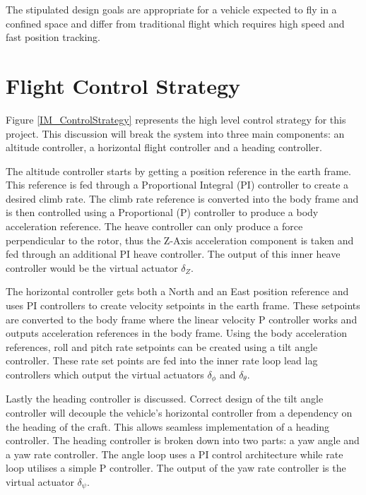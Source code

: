 The stipulated design goals are appropriate for a vehicle expected to fly in a confined space and differ from traditional flight which requires high speed and fast position tracking.

\section{Flight Control Strategy}
Figure \ref{IM_ControlStrategy} represents the high level control strategy for this project. This discussion will break the system into three main components: an altitude controller, a horizontal flight controller and a heading controller.	

The altitude controller starts by getting a position reference in the earth frame. This reference is fed through a Proportional Integral (PI) controller to create a desired climb rate. The climb rate reference is converted into the body frame and is then controlled using a Proportional (P) controller to produce a body acceleration reference. The heave controller can only produce a force perpendicular to the rotor, thus the Z-Axis acceleration component is taken and fed through an additional PI heave controller. The output of this inner heave controller would be the virtual actuator $\delta_Z$.

The horizontal controller gets both a North and an East position reference and uses PI controllers to create velocity setpoints in the earth frame. These setpoints are converted to the body frame where the linear velocity P controller works and outputs acceleration references in the body frame. Using the body acceleration references, roll and pitch rate setpoints can be created using a tilt angle controller. These rate set points are fed into the inner rate loop lead lag controllers which output the virtual actuators $\delta_\phi$ and $\delta_\theta$.

Lastly the heading controller is discussed. Correct design of the tilt angle controller will decouple the vehicle's horizontal controller from a dependency on the heading of the craft. This allows seamless implementation of a heading controller. The heading controller is broken down into two parts: a yaw angle and a yaw rate controller. The angle loop uses a PI control architecture while rate loop utilises a simple P controller. The output of the yaw rate controller is the virtual actuator $\delta_\psi$.


